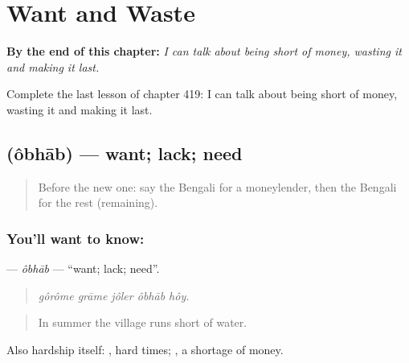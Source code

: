 
\chapter{Want and Waste}
\label{ch:bn-want-and-waste}

\begin{chapteropening}
\textbf{By the end of this chapter:} \emph{I can talk about being short of money, wasting it and making it last.}

Complete the last lesson of chapter 419: I can talk about being short of money, wasting it and making it last.
\end{chapteropening}

\section[\texorpdfstring{\bn{অভাব} (ôbhāb)}{অভাব (ôbhāb)}]{ (ôbhāb) — want; lack; need}

\label{lesson:BN-C419-obhab}



\begin{quote}
Before the new one: say the Bengali for a moneylender, then the Bengali for the rest (remaining).
\end{quote}

\subsection*{You'll want to know: }
\textbf{} — \emph{ôbhāb} — \textquotedblleft{}want; lack; need\textquotedblright{}.

\begin{quote}
    
\end{quote}

\begin{quote}
\emph{gôrôme grāme jôler ôbhāb hôy.}
\end{quote}

\begin{quote}
In summer the village runs short of water.
\end{quote}

Also hardship itself:  , hard times;  , a shortage of money.

